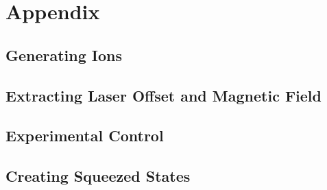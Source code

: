 \chapter{Appendix}

\section{Generating Ions}

\section{Extracting Laser Offset and Magnetic Field}
\label{sec:Laser Offset}

\section{Experimental Control}
\label{sec:Experimental Control}

\section{Creating Squeezed States}
\label{sec:Squeezed States}

